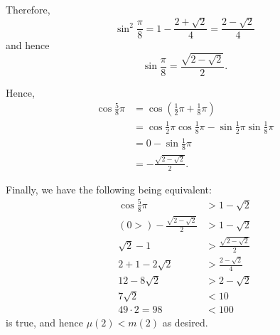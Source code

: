 \begin{enumerate}
\begin{enumerate}
                    Therefore,
                    \[
                        \sin^2 \frac{\pi}{8} = 1 - \frac{2 + \sqrt{2}}{4} = \frac{2 - \sqrt{2}}{4}
                    \]
                    and hence
                    \[
                        \sin \frac{\pi}{8} = \frac{\sqrt{2 - \sqrt{2}}}{2}.
                    \]

                    Hence,
                    \begin{align*}
                        \cos \frac{5}{8}\pi & = \cos \left(\frac{1}{2} \pi + \frac{1}{8} \pi\right)                                 \\
                                            & = \cos \frac{1}{2}\pi \cos \frac{1}{8}\pi - \sin \frac{1}{2} \pi \sin \frac{1}{8} \pi \\
                                            & = 0 - \sin \frac{1}{8} \pi                                                            \\
                                            & = -\frac{\sqrt{2 - \sqrt{2}}}{2}.
                    \end{align*}

                    Finally, we have the following being equivalent:
                    \begin{align*}
                        \cos \frac{5}{8}\pi                  & > 1 - \sqrt{2}                  \\
                        (0>) - \frac{\sqrt{2 - \sqrt{2}}}{2} & > 1 - \sqrt{2}                  \\
                        \sqrt{2} - 1                         & > \frac{\sqrt{2 - \sqrt{2}}}{2} \\
                        2 + 1 - 2 \sqrt{2}                   & > \frac{2 - \sqrt{2}}{4}        \\
                        12 - 8 \sqrt{2}                      & > 2 - \sqrt{2}                  \\
                        7 \sqrt{2}                           & < 10                            \\
                        49 \cdot 2 = 98                      & < 100
                    \end{align*}
                    is true, and hence \(\mu(2) < m(2)\) as desired.
          \end{enumerate}
\end{enumerate}